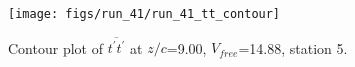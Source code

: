 \begin{figure}[H]
\centering
\texttt{[image: figs/run\_41/run\_41\_tt\_contour]}
\caption{Contour plot of $\overline{t^\prime t^\prime}$ at $z/c$=9.00, $V_{free}$=14.88, station 5.}
\label{fig:run_41_tt_contour}
\end{figure}



